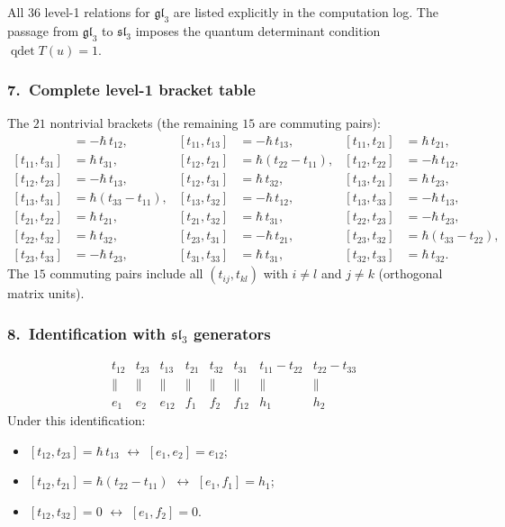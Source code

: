 \noindent
All $36$ level-1 relations for $\mathfrak{gl}_3$ are listed
explicitly in the computation log. The passage from
$\mathfrak{gl}_3$ to $\mathfrak{sl}_3$ imposes the quantum
determinant condition $\operatorname{qdet} T(u) = 1$.

\subsubsection*{7.\ Complete level-1 bracket table}

The $21$ nontrivial brackets (the remaining $15$ are commuting pairs):
\begin{align*}
[t_{11}, t_{12}] &= -\hbar\,t_{12},
&[t_{11}, t_{13}] &= -\hbar\,t_{13},
&[t_{11}, t_{21}] &= \hbar\,t_{21}, \\
[t_{11}, t_{31}] &= \hbar\,t_{31},
&[t_{12}, t_{21}] &= \hbar(t_{22} - t_{11}),
&[t_{12}, t_{22}] &= -\hbar\,t_{12}, \\
[t_{12}, t_{23}] &= -\hbar\,t_{13},
&[t_{12}, t_{31}] &= \hbar\,t_{32},
&[t_{13}, t_{21}] &= \hbar\,t_{23}, \\
[t_{13}, t_{31}] &= \hbar(t_{33} - t_{11}),
&[t_{13}, t_{32}] &= -\hbar\,t_{12},
&[t_{13}, t_{33}] &= -\hbar\,t_{13}, \\
[t_{21}, t_{22}] &= \hbar\,t_{21},
&[t_{21}, t_{32}] &= \hbar\,t_{31},
&[t_{22}, t_{23}] &= -\hbar\,t_{23}, \\
[t_{22}, t_{32}] &= \hbar\,t_{32},
&[t_{23}, t_{31}] &= -\hbar\,t_{21},
&[t_{23}, t_{32}] &= \hbar(t_{33} - t_{22}), \\
[t_{23}, t_{33}] &= -\hbar\,t_{23},
&[t_{31}, t_{33}] &= \hbar\,t_{31},
&[t_{32}, t_{33}] &= \hbar\,t_{32}.
\end{align*}
The $15$ commuting pairs include all $(t_{ij}, t_{kl})$ with
$i \ne l$ and $j \ne k$ (orthogonal matrix units).

\subsubsection*{8.\ Identification with $\mathfrak{sl}_3$ generators}

\[
\begin{array}{cccccccc}
t_{12} & t_{23} & t_{13} & t_{21} & t_{32} & t_{31}
 & t_{11}{-}t_{22} & t_{22}{-}t_{33} \\
\| & \| & \| & \| & \| & \| & \| & \| \\
e_1 & e_2 & e_{12} & f_1 & f_2 & f_{12} & h_1 & h_2
\end{array}
\]
Under this identification:
\begin{itemize}
\item $[t_{12}, t_{23}] = \hbar\,t_{13}$ $\longleftrightarrow$
 $[e_1, e_2] = e_{12}$;
\item $[t_{12}, t_{21}] = \hbar(t_{22} - t_{11})$ $\longleftrightarrow$
 $[e_1, f_1] = h_1$;
\item $[t_{12}, t_{32}] = 0$ $\longleftrightarrow$
 $[e_1, f_2] = 0$.
\end{itemize}


